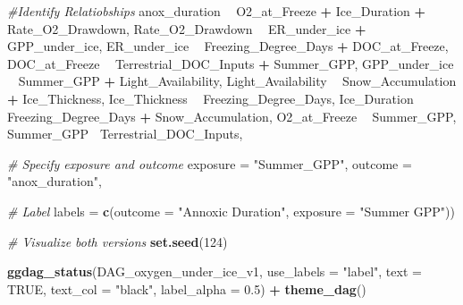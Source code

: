 \documentclass[]{article}
\newenvironment{Shaded}{\begin{snugshade}}{\end{snugshade}}
\newcommand{\CommentTok}[1]{\textcolor[rgb]{0.56,0.35,0.01}{\textit{#1}}}
\newcommand{\DataTypeTok}[1]{\textcolor[rgb]{0.13,0.29,0.53}{#1}}
\newcommand{\DecValTok}[1]{\textcolor[rgb]{0.00,0.00,0.81}{#1}}
\newcommand{\FloatTok}[1]{\textcolor[rgb]{0.00,0.00,0.81}{#1}}
\newcommand{\KeywordTok}[1]{\textcolor[rgb]{0.13,0.29,0.53}{\textbf{#1}}}
\newcommand{\NormalTok}[1]{#1}
\newcommand{\OperatorTok}[1]{\textcolor[rgb]{0.81,0.36,0.00}{\textbf{#1}}}
\newcommand{\OtherTok}[1]{\textcolor[rgb]{0.56,0.35,0.01}{#1}}
\newcommand{\StringTok}[1]{\textcolor[rgb]{0.31,0.60,0.02}{#1}}
\begin{document}
\begin{Shaded}
\begin{Highlighting}[]
      \CommentTok{#Identify Relatiobships }
\NormalTok{      anox_duration }\OperatorTok{~}\StringTok{ }\NormalTok{O2_at_Freeze }\OperatorTok{+}\StringTok{ }\NormalTok{Ice_Duration }\OperatorTok{+}\StringTok{ }\NormalTok{Rate_O2_Drawdown,}
\NormalTok{      Rate_O2_Drawdown }\OperatorTok{~}\StringTok{ }\NormalTok{ER_under_ice }\OperatorTok{+}\StringTok{ }\NormalTok{GPP_under_ice, }
\NormalTok{      ER_under_ice }\OperatorTok{~}\StringTok{ }\NormalTok{Freezing_Degree_Days }\OperatorTok{+}\StringTok{ }\NormalTok{DOC_at_Freeze,}
\NormalTok{      DOC_at_Freeze }\OperatorTok{~}\StringTok{ }\NormalTok{Terrestrial_DOC_Inputs }\OperatorTok{+}\StringTok{ }\NormalTok{Summer_GPP, }
\NormalTok{      GPP_under_ice }\OperatorTok{~}\StringTok{ }\NormalTok{Summer_GPP }\OperatorTok{+}\StringTok{ }\NormalTok{Light_Availability,}
\NormalTok{      Light_Availability }\OperatorTok{~}\StringTok{ }\NormalTok{Snow_Accumulation }\OperatorTok{+}\StringTok{ }\NormalTok{Ice_Thickness,}
\NormalTok{      Ice_Thickness }\OperatorTok{~}\StringTok{ }\NormalTok{Freezing_Degree_Days,}
\NormalTok{      Ice_Duration }\OperatorTok{~}\StringTok{ }\NormalTok{Freezing_Degree_Days }\OperatorTok{+}\StringTok{ }\NormalTok{Snow_Accumulation, }
\NormalTok{      O2_at_Freeze }\OperatorTok{~}\StringTok{ }\NormalTok{Summer_GPP,}
\NormalTok{      Summer_GPP}\OperatorTok{~}\StringTok{ }\NormalTok{Terrestrial_DOC_Inputs,}
    
      \CommentTok{# Specify exposure and outcome }
      \DataTypeTok{exposure =} \StringTok{"Summer_GPP"}\NormalTok{, }
      \DataTypeTok{outcome =} \StringTok{"anox_duration"}\NormalTok{,}
      
      \CommentTok{# Label }
      \DataTypeTok{labels =} \KeywordTok{c}\NormalTok{(}\DataTypeTok{outcome =} \StringTok{"Annoxic Duration"}\NormalTok{,}
                 \DataTypeTok{exposure =} \StringTok{"Summer GPP"}\NormalTok{))}

\CommentTok{# Visualize both versions }
\KeywordTok{set.seed}\NormalTok{(}\DecValTok{124}\NormalTok{)}

\KeywordTok{ggdag_status}\NormalTok{(DAG_oxygen_under_ice_v1,}
             \DataTypeTok{use_labels =} \StringTok{"label"}\NormalTok{,}
             \DataTypeTok{text =} \OtherTok{TRUE}\NormalTok{,}
             \DataTypeTok{text_col =} \StringTok{"black"}\NormalTok{,}
             \DataTypeTok{label_alpha =} \FloatTok{0.5}\NormalTok{) }\OperatorTok{+}\StringTok{ }\KeywordTok{theme_dag}\NormalTok{()}
\end{Highlighting}
\end{Shaded}
\end{document}
